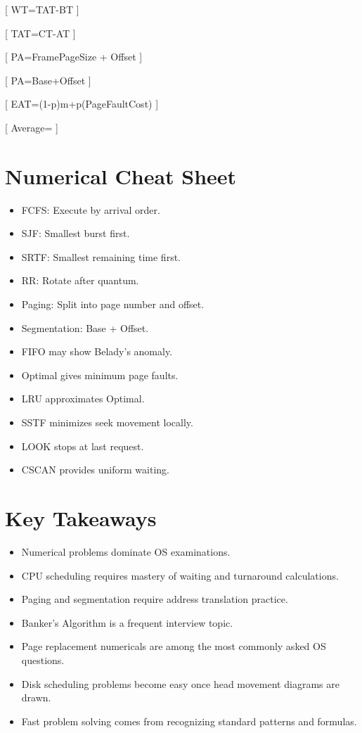 [
WT=TAT-BT
]

[
TAT=CT-AT
]

[
PA=Frame\times PageSize + Offset
]

[
PA=Base+Offset
]

[
EAT=(1-p)m+p(PageFaultCost)
]

[
Average=
]

\section{Numerical Cheat Sheet}

\begin{itemize}
\item FCFS: Execute by arrival order.
\item SJF: Smallest burst first.
\item SRTF: Smallest remaining time first.
\item RR: Rotate after quantum.
\item Paging: Split into page number and offset.
\item Segmentation: Base + Offset.
\item FIFO may show Belady's anomaly.
\item Optimal gives minimum page faults.
\item LRU approximates Optimal.
\item SSTF minimizes seek movement locally.
\item LOOK stops at last request.
\item CSCAN provides uniform waiting.
\end{itemize}

\section{Key Takeaways}

\begin{itemize}
\item Numerical problems dominate OS examinations.
\item CPU scheduling requires mastery of waiting and turnaround calculations.
\item Paging and segmentation require address translation practice.
\item Banker's Algorithm is a frequent interview topic.
\item Page replacement numericals are among the most commonly asked OS questions.
\item Disk scheduling problems become easy once head movement diagrams are drawn.
\item Fast problem solving comes from recognizing standard patterns and formulas.
\end{itemize}
